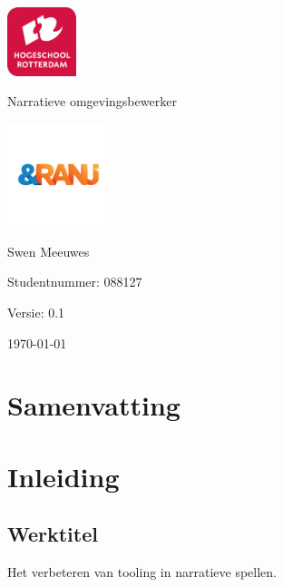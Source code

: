 \documentclass{report}
\newcommand{\versionnumber}{0.1}
\newcommand{\name}{Swen Meeuwes}
\newcommand{\studentnumber}{088127}
\renewcommand{\title}{Narratieve omgevingsbewerker}
\newcommand{\subtitle}{}
\begin{document}
\begin{titlepage}
        \centering
        \includegraphics[width=2cm]{Images/University}\par
        \vspace{4\baselineskip}
        {\Huge\title\par}
        {\Large\subtitle\par}
        \par
        \includegraphics[width=3cm]{Images/Organisation}
        \vspace{4\baselineskip}
        \par
        {\Large\name\par}
        {Studentnummer: \studentnumber\par}
        \vfill
        {\hfill Versie: \versionnumber\par}
        {\hfill \today}
\end{titlepage}

\chapter*{Samenvatting}

\newpage

\tableofcontents

\newpage

\chapter{Inleiding}
\section{Werktitel}
Het verbeteren van tooling in narratieve spellen.
\end{document}
